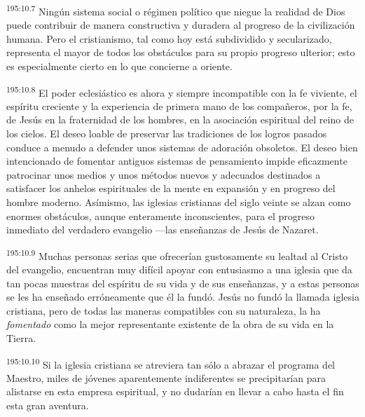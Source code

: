 \par 
\textsuperscript{195:10.7} Ningún sistema social o régimen político que niegue la realidad de Dios puede contribuir de manera constructiva y duradera al progreso de la civilización humana. Pero el cristianismo, tal como hoy está subdividido y secularizado, representa el mayor de todos los obstáculos para su propio progreso ulterior; esto es especialmente cierto en lo que concierne a oriente.

\par 
\textsuperscript{195:10.8} El poder eclesiástico es ahora y siempre incompatible con la fe viviente, el espíritu creciente y la experiencia de primera mano de los compañeros, por la fe, de Jesús en la fraternidad de los hombres, en la asociación espiritual del reino de los cielos. El deseo loable de preservar las tradiciones de los logros pasados conduce a menudo a defender unos sistemas de adoración obsoletos. El deseo bien intencionado de fomentar antiguos sistemas de pensamiento impide eficazmente patrocinar unos medios y unos métodos nuevos y adecuados destinados a satisfacer los anhelos espirituales de la mente en expansión y en progreso del hombre moderno. Asímismo, las iglesias cristianas del siglo veinte se alzan como enormes obstáculos, aunque enteramente inconscientes, para el progreso inmediato del verdadero evangelio ---las enseñanzas de Jesús de Nazaret.

\par 
\textsuperscript{195:10.9} Muchas personas serias que ofrecerían gustosamente su lealtad al Cristo del evangelio, encuentran muy difícil apoyar con entusiasmo a una iglesia que da tan pocas muestras del espíritu de su vida y de sus enseñanzas, y a estas personas se les ha enseñado erróneamente que él la fundó. Jesús no fundó la llamada iglesia cristiana, pero de todas las maneras compatibles con su naturaleza, la ha \textit{fomentado} como la mejor representante existente de la obra de su vida en la Tierra.

\par 
\textsuperscript{195:10.10} Si la iglesia cristiana se atreviera tan sólo a abrazar el programa del Maestro, miles de jóvenes aparentemente indiferentes se precipitarían para alistarse en esta empresa espiritual, y no dudarían en llevar a cabo hasta el fin esta gran aventura.

